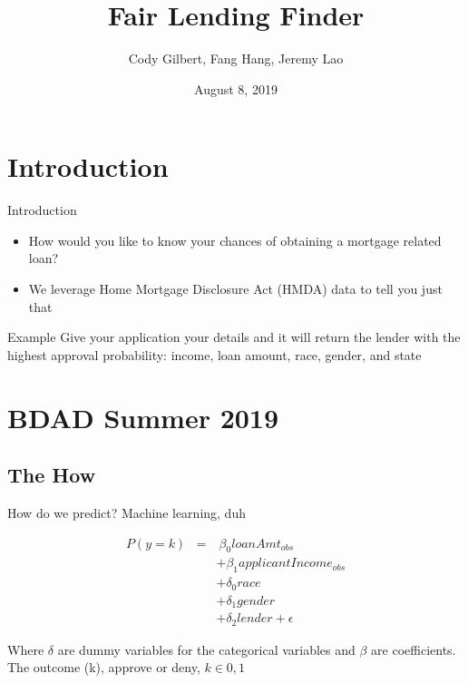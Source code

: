 \documentclass{beamer}
\title[Big Mortgage Data]{Fair Lending Finder}
\author{Cody Gilbert, Fang Hang, Jeremy Lao}
\institute{NYU Courant, Computer Science}
\date{August 8, 2019}
\begin{document}
\begin{frame}
  \titlepage
\end{frame}


\section{Introduction}

\begin{frame}{Introduction}

\begin{itemize}
  \item How would you like to know your chances of obtaining a mortgage related loan? 
  \item We leverage Home Mortgage Disclosure Act (HMDA) data to tell you just that
\end{itemize}

\vskip 0.5cm

\begin{block}{Example}
Give your application your details and it will return the lender with the highest approval probability: income, loan amount, race, gender, and state
\end{block}

\end{frame}

\section{BDAD Summer 2019}

\subsection{The How}

\begin{frame}{How do we predict? Machine learning, duh}

\begin{eqnarray*}
P(y=k) & = & \ \beta_0 loanAmt_{obs}  \\
& &  + \beta_1 applicantIncome_{obs} \\
& & + \delta_0 race  \\ 
& &  + \delta_1 gender \\
& & +  \delta_2 lender + \epsilon
\end{eqnarray*}


Where $\delta$ are dummy variables for the categorical variables and $\beta$ are coefficients. The outcome (k), approve or deny, $k \in 0,1$

\end{frame}
\end{document}
